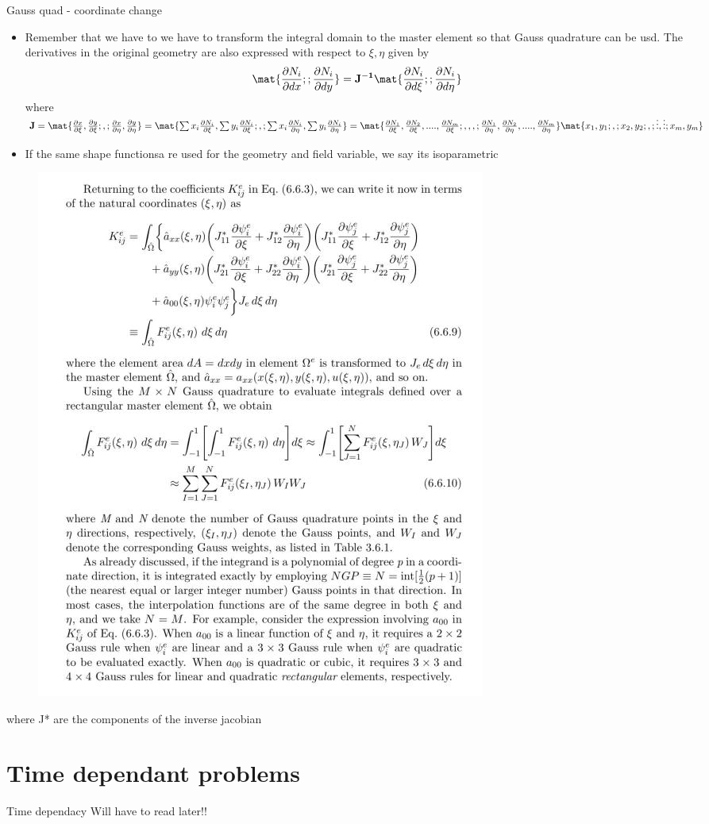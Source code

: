 	
	\begin{frame}{Gauss quad - coordinate change}
		\begin{itemize}
			\item Remember that we have to we have to transform the integral domain to the master element so that Gauss quadrature can be usd. The derivatives in the original geometry are also expressed with respect to $\xi,\eta$ given by
			\begin{equation}
			\mat{\frac{\partial N_i}{\partial dx}; ;\frac{\partial N_i}{\partial dy} } = \ve{J^{-1}} \mat{\frac{\partial N_i}{\partial d\xi}; ;\frac{\partial N_i}{\partial d\eta} } 
			\end{equation}
			where $\ve{J} = \mat{\frac{\partial x}{\partial \xi}, \frac{\partial y}{\partial \xi}; , ; \frac{\partial x}{\partial \eta}, \frac{\partial y}{\partial \eta}} =
			\mat {\sum x_i \frac{\partial N_i}{\partial \xi}, \sum y_i \frac{\partial N_i}{\partial \xi} ; , ; 
			\sum x_i \frac{\partial N_i}{\partial \eta}, \sum y_i \frac{\partial N_i}{\partial \eta}} = \mat{\frac{\partial N_1}{\partial \xi}, \frac{\partial N_2}{\partial \xi}, .... ,\frac{\partial N_m}{\partial \xi} ; , , ,;
			\frac{\partial N_1}{\partial \eta}, \frac{\partial N_2}{\partial \eta}, ...., \frac{\partial N_m}{\partial \eta} }
	 		\mat{x_1, y_1; , ; x_2, y_2; , ; \vdots, \vdots; x_m,y_m}$ 
	 		\item If the same shape functionsa re used for the geometry and field variable, we say its isoparametric
		\end{itemize}
	\end{frame}


	\begin{frame}
		\begin{figure}
			\centering
			\includegraphics[width=0.6 \linewidth]{Figure/fig29} 		
		\end{figure} 
	where J* are the components of the inverse jacobian
	\end{frame}


	\section{Time dependant problems}
	
	\begin{frame}{Time dependacy}
		Will have to read later!!
	\end{frame}



